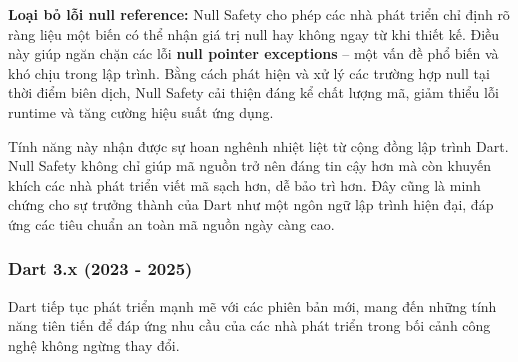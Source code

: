 \documentclass[../DoAn.tex]{subfiles}
\numberwithin{figure}{chapter}
\begin{document}
    \textbf{Loại bỏ lỗi null reference: } 
    Null Safety cho phép các nhà phát triển chỉ định rõ ràng liệu một biến có thể nhận giá trị null hay không ngay từ khi thiết kế. Điều này giúp ngăn chặn các lỗi \textbf{null pointer exceptions} – một vấn đề phổ biến và khó chịu trong lập trình. Bằng cách phát hiện và xử lý các trường hợp null tại thời điểm biên dịch, Null Safety cải thiện đáng kể chất lượng mã, giảm thiểu lỗi runtime và tăng cường hiệu suất ứng dụng.

Tính năng này nhận được sự hoan nghênh nhiệt liệt từ cộng đồng lập trình Dart. Null Safety không chỉ giúp mã nguồn trở nên đáng tin cậy hơn mà còn khuyến khích các nhà phát triển viết mã sạch hơn, dễ bảo trì hơn. Đây cũng là minh chứng cho sự trưởng thành của Dart như một ngôn ngữ lập trình hiện đại, đáp ứng các tiêu chuẩn an toàn mã nguồn ngày càng cao.

\subsubsection{Dart 3.x (2023 - 2025)}
Dart tiếp tục phát triển mạnh mẽ với các phiên bản mới, mang đến những tính năng tiên tiến để đáp ứng nhu cầu của các nhà phát triển trong bối cảnh công nghệ không ngừng thay đổi.
\end{document}

